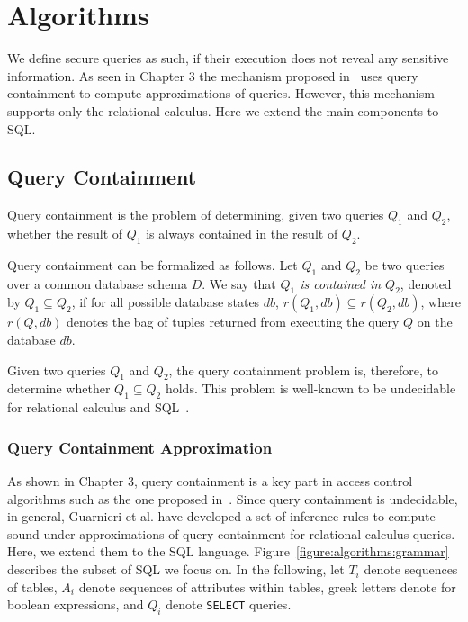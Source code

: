 \section{Algorithms}
%
We define secure queries as such, if their execution does not reveal any sensitive information.
%
As seen in Chapter 3 the mechanism proposed in~\cite{guarnieri2016strong} uses query containment to compute approximations of queries.
%
However, this mechanism supports only the relational calculus.
%
Here we extend the main components to SQL.

\subsection{Query Containment}

Query containment is the problem of determining, given two queries $Q_1$ and $Q_2$, whether the result of $Q_1$ is always contained in the result of $Q_2$. %

Query containment can be formalized as follows.
%
Let $Q_1$ and $Q_2$ be two queries over a common database schema $D$.
%
We say that \emph{$Q_1$ is contained in $Q_2$}, denoted by $Q_1 \subseteq Q_2$, if for all possible database states $\mathit{db}$, $r(Q_1,\mathit{db}) \subseteq r(Q_2, \mathit{db})$, where $r(Q, db)$ denotes the bag of tuples returned from executing the query $Q$ on the database $db$.


Given two queries $Q_1$ and $Q_2$, the query containment problem is, therefore, to determine whether $Q_1 \subseteq Q_2$ holds.
%
This problem is well-known to be undecidable for relational calculus and SQL~\cite{abiteboul1995foundations}.

\subsubsection{Query Containment Approximation}

As shown in Chapter 3, query containment is a key part in access control algorithms such as the one proposed in~\cite{guarnieri2016strong}.
Since query containment is undecidable, in general, Guarnieri et al. have developed a set of inference rules to compute sound under-approximations of query containment for relational calculus queries.
%
Here, we extend them to the SQL language.
%
Figure~\ref{figure:algorithms:grammar} describes the subset of SQL we focus on. 
%
In the following, let $T_i$ denote sequences of tables, $A_i$ denote sequences of attributes within tables, greek letters denote for boolean expressions, and $Q_i$ denote \texttt{SELECT} queries.


